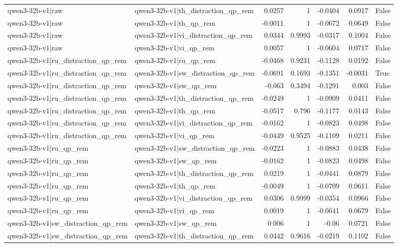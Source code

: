 \begin{table}
\begin{tabular}{l l r r r r l}
qwen3-32b-v1|raw & qwen3-32b-v1|th_distraction_qp_rem & 0.0257 & 1 & -0.0404 & 0.0917 & False \\
qwen3-32b-v1|raw & qwen3-32b-v1|th_qp_rem & -0.0011 & 1 & -0.0672 & 0.0649 & False \\
qwen3-32b-v1|raw & qwen3-32b-v1|vi_distraction_qp_rem & 0.0344 & 0.9993 & -0.0317 & 0.1004 & False \\
qwen3-32b-v1|raw & qwen3-32b-v1|vi_qp_rem & 0.0057 & 1 & -0.0604 & 0.0717 & False \\
qwen3-32b-v1|ru_distraction_qp_rem & qwen3-32b-v1|ru_qp_rem & -0.0468 & 0.9231 & -0.1128 & 0.0192 & False \\
qwen3-32b-v1|ru_distraction_qp_rem & qwen3-32b-v1|sw_distraction_qp_rem & -0.0691 & 0.1693 & -0.1351 & -0.0031 & True \\
qwen3-32b-v1|ru_distraction_qp_rem & qwen3-32b-v1|sw_qp_rem & -0.063 & 0.3494 & -0.1291 & 0.003 & False \\
qwen3-32b-v1|ru_distraction_qp_rem & qwen3-32b-v1|th_distraction_qp_rem & -0.0249 & 1 & -0.0909 & 0.0411 & False \\
qwen3-32b-v1|ru_distraction_qp_rem & qwen3-32b-v1|th_qp_rem & -0.0517 & 0.796 & -0.1177 & 0.0143 & False \\
qwen3-32b-v1|ru_distraction_qp_rem & qwen3-32b-v1|vi_distraction_qp_rem & -0.0162 & 1 & -0.0823 & 0.0498 & False \\
qwen3-32b-v1|ru_distraction_qp_rem & qwen3-32b-v1|vi_qp_rem & -0.0449 & 0.9525 & -0.1109 & 0.0211 & False \\
qwen3-32b-v1|ru_qp_rem & qwen3-32b-v1|sw_distraction_qp_rem & -0.0223 & 1 & -0.0883 & 0.0438 & False \\
qwen3-32b-v1|ru_qp_rem & qwen3-32b-v1|sw_qp_rem & -0.0162 & 1 & -0.0823 & 0.0498 & False \\
qwen3-32b-v1|ru_qp_rem & qwen3-32b-v1|th_distraction_qp_rem & 0.0219 & 1 & -0.0441 & 0.0879 & False \\
qwen3-32b-v1|ru_qp_rem & qwen3-32b-v1|th_qp_rem & -0.0049 & 1 & -0.0709 & 0.0611 & False \\
qwen3-32b-v1|ru_qp_rem & qwen3-32b-v1|vi_distraction_qp_rem & 0.0306 & 0.9999 & -0.0354 & 0.0966 & False \\
qwen3-32b-v1|ru_qp_rem & qwen3-32b-v1|vi_qp_rem & 0.0019 & 1 & -0.0641 & 0.0679 & False \\
qwen3-32b-v1|sw_distraction_qp_rem & qwen3-32b-v1|sw_qp_rem & 0.006 & 1 & -0.06 & 0.0721 & False \\
qwen3-32b-v1|sw_distraction_qp_rem & qwen3-32b-v1|th_distraction_qp_rem & 0.0442 & 0.9616 & -0.0219 & 0.1102 & False \\

\end{tabular}
\end{table}
